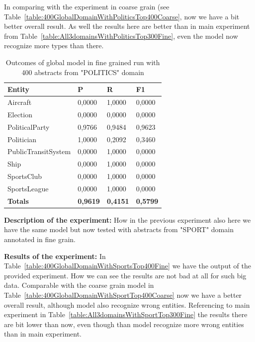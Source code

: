 \documentclass[thesis=M,english]{FITthesis}[2018/05/30]
\begin{document}
In comparing with the experiment in coarse grain (see Table~\ref{table:400GlobalDomainWithPoliticsTop400Coarse}, now we have a bit better overall result. As well the results here are better than in main experiment from Table~\ref{table:All3domainsWithPoliticsTop300Fine}, even the model now recognize more types than there.

	\begin{table}[H]\centering
		\begin{tabular}{|l|l|l|l|}
			\hline {\textbf{Entity}} & {\textbf{P}} & {\textbf{R}} & {\textbf{F1}}\\\hline
				Aircraft & 0,0000 & 1,0000 & 0,0000\\				
				Election & 0,0000 & 0,0000 & 0,0000\\
				PoliticalParty & 0,9766 & 0,9484 & 0,9623\\
				Politician & 1,0000 & 0,2092 & 0,3460\\
				PublicTransitSystem & 0,0000 & 1,0000 & 0,0000\\
				Ship & 0,0000 & 1,0000 & 0,0000\\
				SportsClub & 0,0000 & 1,0000 & 0,0000\\
				SportsLeague & 0,0000 & 1,0000 & 0,0000\\\hline
				\textbf{Totals} & \textbf{0,9619} & \textbf{0,4151} & \textbf{0,5799}\\\hline
		\end{tabular}
		\caption{Outcomes of global model in fine grained run with 400 abstracts from "POLITICS" domain \label{table:400GlobalDomainWithPoliticsTop400Fine}}
	\end{table}	

\textbf{Description of the experiment:} How in the previous experiment also here we have the same model but now tested with abstracts from "SPORT" domain annotated in fine grain.

\textbf{Results of the experiment:} In Table~\ref{table:400GlobalDomainWithSportsTop400Fine} we have the output of the provided experiment. How we can see the results are not bad at all for such big data. Comparable with the coarse grain model in Table~\ref{table:400GlobalDomainWithSportTop400Coarse} now we have a better overall result, although model also recognize wrong entities. Referencing to main experiment in Table~\ref{table:All3domainsWithSportTop300Fine} the results there are bit lower than now, even though than model recognize more wrong entities than in main experiment.
\end{document}
